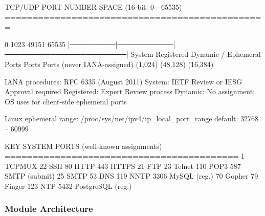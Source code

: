\documentclass[11pt,letterpaper]{article}
\begin{document}
\begin{asciibox}
TCP/UDP PORT NUMBER SPACE (16-bit: 0 - 65535)
===============================================

 0         1023        49151                    65535
 |─────────|───────────|────────────────────────|
 System    Registered  Dynamic / Ephemeral
 Ports     Ports       Ports (never IANA-assigned)
 (1,024)   (48,128)    (16,384)
 
 IANA procedures: RFC 6335 (August 2011)
 System:     IETF Review or IESG Approval required
 Registered: Expert Review process
 Dynamic:    No assignment; OS uses for client-side ephemeral ports
 
 Linux ephemeral range: /proc/sys/net/ipv4/ip_local_port_range
                        default: 32768 – 60999

KEY SYSTEM PORTS (well-known assignments)
==========================================
  1   TCPMUX       22  SSH          80  HTTP        443  HTTPS
  21  FTP          23  Telnet       110 POP3         587  SMTP (submit)
  25  SMTP         53  DNS          119 NNTP        3306  MySQL (reg.)
  70  Gopher       79  Finger       123 NTP          5432  PostgreSQL (reg.)
\end{asciibox}

\subsubsection{Module Architecture}
\end{document}
